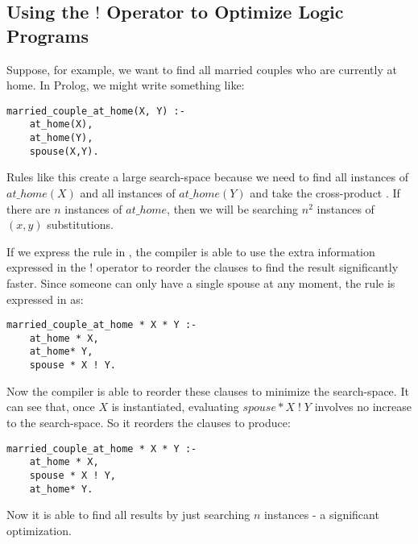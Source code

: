 \subsection{Using the $!$ Operator to Optimize Logic Programs}
Suppose, for example, we want to find all married couples who are currently at home.
In Prolog, we might write something like:
\begin{verbatim}
married_couple_at_home(X, Y) :-
    at_home(X),
    at_home(Y),
    spouse(X,Y).
\end{verbatim}	
Rules like this create a large search-space because we need to find all instances of $at\_home(X)$ and all instances of  $at\_home(Y)$ and take the cross-product \cite{smith-and-genesereth}. If there are $n$ instances of $at\_home$, then we will be searching $n^2$ instances of $(x,y)$ substitutions.

If we express the rule in \ELFULL{}, the compiler is able to use the extra information expressed in the $!$ operator to reorder the clauses to find the result significantly faster.
Since someone can only have a single spouse at any moment, the rule is expressed in \ELFULL{} as:
\begin{verbatim}
married_couple_at_home * X * Y :-
    at_home * X,
    at_home* Y,
    spouse * X ! Y.
\end{verbatim}	
Now the compiler is able to reorder these clauses to minimize the search-space. 
It can see that, once $X$ is instantiated, evaluating $spouse * X \; ! \; Y$ involves no increase to the search-space.
So it reorders the clauses to produce:
\begin{verbatim}
married_couple_at_home * X * Y :-
    at_home * X,
    spouse * X ! Y,
    at_home* Y.
\end{verbatim}	
Now it is able to find all results by just searching $n$ instances - a significant optimization.

